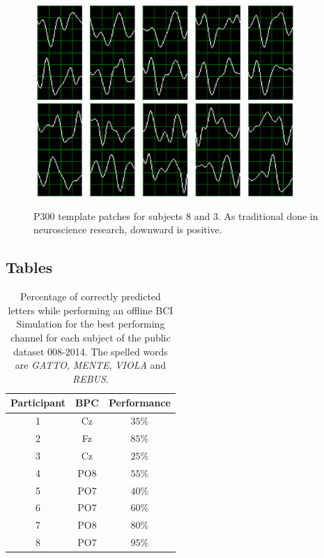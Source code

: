 \documentclass[utf8]{frontiersSCNS} %
\begin{document}
\begin{figure}[htb]
\centering
\includegraphics[width=10cm]{subject8.png}\label{subject8}
\includegraphics[width=10cm]{subject3.png}\label{subject3}
\caption{P300 template patches for subjects 8 and 3. As traditional done in neuroscience research, downward is positive. }
\label{fig:p300templates}
\end{figure}

\subsection{Tables}

\begin{table}[htb]
\caption{Percentage of correctly predicted letters while performing an offline BCI Simulation for the best performing channel for each subject of the public dataset 008-2014. The spelled words are \textit{GATTO}, \textit{MENTE}, \textit{VIOLA} and \textit{REBUS}. }
\centering
\begin{tabular}{ccc}
\toprule
\textbf{Participant}	&  \textbf{BPC}	& \textbf{Performance}\\
\midrule
1     &     Cz   &   $35\%$  \\
2     &     Fz   &   $85\%$  \\
3     &     Cz   &   $25\%$  \\
4     &     PO8 &   $55\%$  \\
5     &     PO7 &   $40\%$ \\
6     &     PO7 &   $60\%$  \\
7     &     PO8 &   $80\%$  \\
8     &     PO7 &   $95\%$ \\

\end{tabular}
\label{tab:results}
\end{table}
\end{document}
